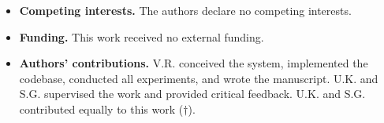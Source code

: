 \documentclass[pdflatex,sn-vancouver-num]{sn-jnl}%
\theoremstyle{thmstyleone}%
\theoremstyle{thmstyletwo}%
\theoremstyle{thmstylethree}%
\begin{document}
\begin{itemize}
  obtained from participants; only the anonymised, aggregate pilot results
  reported in Table~\ref{tab:pilot} are available.
  \begin{itemize}
    \item[] \textbf{Project name:} TRIsecure V2
    \item[] \textbf{Project home page:}
      \url{https://github.com/vivekreddy9036/TriSecure}
    \item[] \textbf{Archived version:} Tagged release corresponding to this
      manuscript's submitted results (repository release tags)
    \item[] \textbf{Operating system(s):} Linux (target deployment:
      Raspberry Pi OS / Ubuntu~22.04 ARM64); evaluation and simulation
      scripts are platform-independent
    \item[] \textbf{Programming language:} Python~3.11
    \item[] \textbf{Other requirements:} ONNX Runtime~1.17, NumPy~1.26,
      SciPy, pandas, scikit-learn; see \texttt{requirements.txt} in the
      repository for the full dependency list
    \item[] \textbf{License:} MIT License
    \item[] \textbf{Any restrictions to use by non-academics:} None
  \end{itemize}
\item \textbf{Competing interests.} The authors declare no competing
  interests.
\item \textbf{Funding.} This work received no external funding.
\item \textbf{Authors' contributions.} V.R. conceived the system, implemented
  the codebase, conducted all experiments, and wrote the manuscript.
  U.K. and S.G. supervised the work and provided critical feedback.
  U.K. and S.G. contributed equally to this work ($\dagger$).
\end{itemize}


\end{document}
